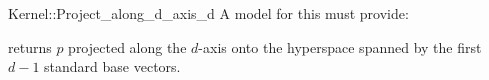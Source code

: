 \begin{ccRefFunctionObjectConcept}{Kernel::Project_along_d_axis_d}
A model for this must provide:


{returns $p$ projected along the $d$-axis onto the hyperspace
spanned by the first $d-1$ standard base vectors.}

\end{ccRefFunctionObjectConcept}
